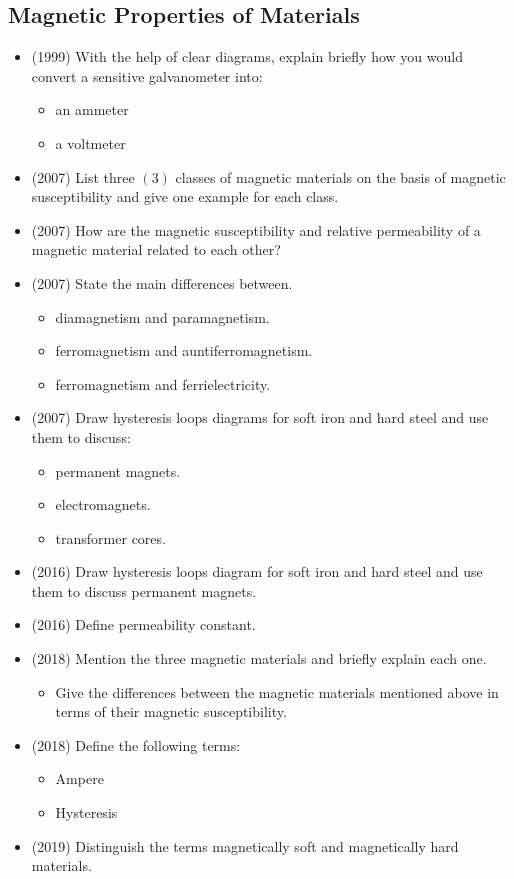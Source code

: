 \documentclass{article}
\begin{document}
\subsection{Magnetic Properties of Materials}
\begin{itemize}
\item (1999)  With the help of clear diagrams, explain briefly how you would convert a sensitive galvanometer into:\begin{itemize}
\item an ammeter
\item a voltmeter
\end{itemize}
\item (2007)  List three $ (3)$ classes of magnetic materials on the basis of magnetic susceptibility and give one example for each class.
\item (2007)  How are the magnetic susceptibility and relative permeability of a magnetic material related to each other?
\item (2007)  State the main differences between.\begin{itemize}
\item diamagnetism and paramagnetism. 
\item ferromagnetism and auntiferromagnetism. 
\item ferromagnetism and ferrielectricity. 
\end{itemize}
\item (2007)  Draw hysteresis loops diagrams for soft iron and hard steel and use them to discuss:\begin{itemize}
\item permanent magnets.
\item electromagnets.
\item transformer cores. 
\end{itemize}
\item (2016)  Draw hysteresis loops diagram for soft iron and hard steel and use them to discuss permanent magnets.
\item (2016)  Define permeability constant.
\item (2018)  Mention the three magnetic materials and briefly explain each one. \begin{itemize}
\item Give the differences between the magnetic materials mentioned above in terms of their magnetic susceptibility. 
\end{itemize}
\item (2018)  Define the following terms:\begin{itemize}
\item Ampere 
\item Hysteresis 
\end{itemize}
\item (2019)  Distinguish the terms magnetically soft and magnetically hard materials.
\end{itemize}
\end{document}
